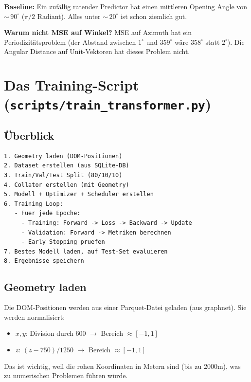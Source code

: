 \documentclass[12pt, a4paper]{article}
\begin{document}
\textbf{Baseline:} Ein zuf\"allig ratender Predictor hat einen mittleren
Opening Angle von ${\sim}\,90^\circ$ ($\pi/2$ Radiant). Alles unter ${\sim}\,20^\circ$ ist
schon ziemlich gut.

\textbf{Warum nicht MSE auf Winkel?} MSE auf Azimuth hat ein Periodizit\"atsproblem
(der Abstand zwischen $1^\circ$ und $359^\circ$ w\"are $358^\circ$ statt $2^\circ$). Die Angular
Distance auf Unit-Vektoren hat dieses Problem nicht.


\newpage
\section{Das Training-Script (\texttt{scripts/train\_transformer.py})}

\subsection{\"Uberblick}

\begin{lstlisting}[caption={Trainings-Ablauf (Pseudo-Code)},language={}]
1. Geometry laden (DOM-Positionen)
2. Dataset erstellen (aus SQLite-DB)
3. Train/Val/Test Split (80/10/10)
4. Collator erstellen (mit Geometry)
5. Modell + Optimizer + Scheduler erstellen
6. Training Loop:
   - Fuer jede Epoche:
     - Training: Forward -> Loss -> Backward -> Update
     - Validation: Forward -> Metriken berechnen
     - Early Stopping pruefen
7. Bestes Modell laden, auf Test-Set evaluieren
8. Ergebnisse speichern
\end{lstlisting}

\subsection{Geometry laden}

Die DOM-Positionen werden aus einer Parquet-Datei geladen (aus graphnet).
Sie werden normalisiert:
\begin{itemize}
    \item $x, y$: Division durch 600 $\to$ Bereich $\approx [-1, 1]$
    \item $z$: $(z - 750) / 1250$ $\to$ Bereich $\approx [-1, 1]$
\end{itemize}

Das ist wichtig, weil die rohen Koordinaten in Metern sind (bis zu 2000m),
was zu numerischen Problemen f\"uhren w\"urde.
\end{document}
